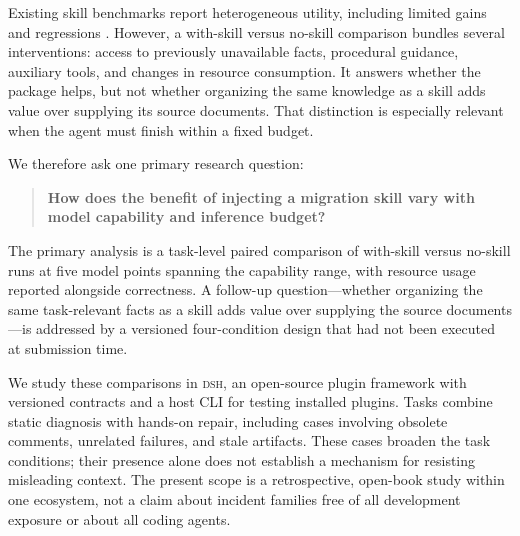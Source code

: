 \documentclass[11pt]{article}
\newcommand{\framework}{\textsc{dsh}}
\begin{document}
Existing skill benchmarks report heterogeneous utility, including limited gains and regressions \citep{skillsbench,swe-skills-bench}.
However, a with-skill versus no-skill comparison bundles several interventions: access to previously unavailable facts, procedural guidance, auxiliary tools, and changes in resource consumption.
It answers whether the package helps, but not whether organizing the same knowledge as a skill adds value over supplying its source documents.
That distinction is especially relevant when the agent must finish within a fixed budget.

We therefore ask one primary research question:
\begin{quote}
\textbf{How does the benefit of injecting a migration skill vary with model capability and inference budget?}
\end{quote}
The primary analysis is a task-level paired comparison of with-skill versus no-skill runs at five model points spanning the capability range, with resource usage reported alongside correctness.
A follow-up question---whether organizing the same task-relevant facts as a skill adds value over supplying the source documents---is addressed by a versioned four-condition design that had not been executed at submission time.

We study these comparisons in \framework{}, an open-source plugin framework with versioned contracts and a host CLI for testing installed plugins.
Tasks combine static diagnosis with hands-on repair, including cases involving obsolete comments, unrelated failures, and stale artifacts.
These cases broaden the task conditions; their presence alone does not establish a mechanism for resisting misleading context.
The present scope is a retrospective, open-book study within one ecosystem, not a claim about incident families free of all development exposure or about all coding agents.
\end{document}
